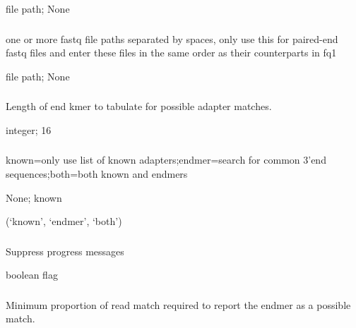\documentclass[letterpaper,11pt,english]{sphinxmanual}
\begin{document}
 file path;  None


\subsubsection{}
\label{\detokenize{prog_desc:fq2}}
 one or more fastq file paths separated by spaces, only use this for paired-end fastq files and enter these files in the same order as their counterparts in \textendash{}fq1

 file path;  None


\subsubsection{}
\label{\detokenize{prog_desc:k-end-klength}}
 Length of end kmer to tabulate for possible adapter matches.

 integer;  16


\subsubsection{}
\label{\detokenize{prog_desc:m-mode}}
 known=only use list of known adapters;endmer=search for common 3’end sequences;both=both known and endmers

 None;  known

 (‘known’, ‘endmer’, ‘both’)


\subsubsection{}
\label{\detokenize{prog_desc:quiet}}
 Suppress progress messages

 boolean flag


\subsubsection{}
\label{\detokenize{prog_desc:e-end-min-match}}
 Minimum proportion of read match required to report the endmer as a possible match.
\end{document}
